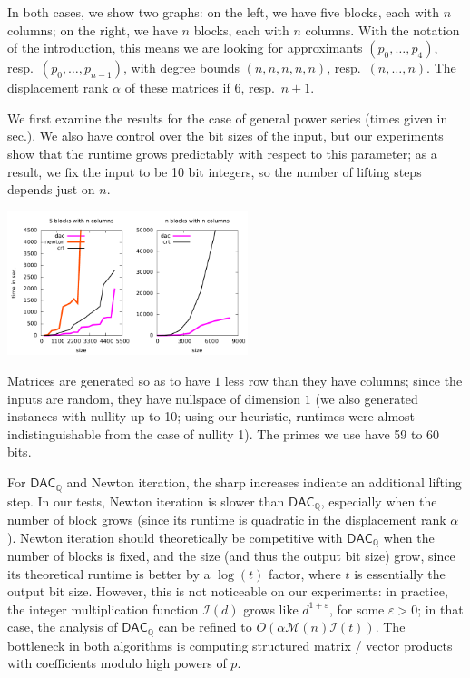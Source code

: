 \documentclass[sigconf]{acmart}
\newcommand{\Q}{\ensuremath{\mathbb{Q}}}
\newcommand{\M}{\ensuremath{\mathscr{M}}}
\newcommand{\I}{\ensuremath{\mathscr{I}}}
\newcommand{\DACQ}{\ensuremath{\mathsf{DAC}_\Q}}
\theoremstyle{acmdefinition}
\begin{document}
In both cases, we show two graphs: on the left, we have five blocks,
each with $n$ columns; on the right, we have $n$ blocks, each with $n$
columns.  With the notation of the introduction, this means we are
looking for approximants $(p_0,\dots,p_4)$, resp.\
$(p_0,\dots,p_{n-1})$, with degree bounds $(n,n,n,n,n)$, resp.\
$(n,\dots,n)$. The displacement rank $\alpha$ of these matrices if
$6$, resp.\ $n+1$.

We first examine the results for the case of general power series
(times given in sec.). We also have control over the bit sizes of the
input, but our experiments show that the runtime grows predictably
with respect to this parameter; as a result, we fix the input to be 10
bit integers, so the number of lifting steps depends just on $n$.

\includegraphics[width=7cm]{plots/compare-general.pdf}

Matrices are generated so as to have $1$ less row than they have
columns; since the inputs are random, they have nullspace of
dimension $1$ (we also generated instances with nullity up to 10;
using our heuristic, runtimes were almost indistinguishable from the
case of nullity 1). The primes we use have 59 to 60 bits.


For $\DACQ$ and Newton iteration, the sharp increases indicate an
additional lifting step. In our tests, Newton iteration is slower than
$\DACQ$, especially when the number of block grows (since its runtime
is quadratic in the displacement rank $\alpha$). Newton iteration
should theoretically be competitive with $\DACQ$ when the number of
blocks is fixed, and the size (and thus the output bit size) grow,
since its theoretical runtime is better by a $\log(t)$ factor, where
$t$ is essentially the output bit size. However, this is not
noticeable on our experiments: in practice, the integer multiplication
function $\I(d)$ grows like $d^{1+\varepsilon}$, for some $\varepsilon
> 0$; in that case, the analysis of $\DACQ$ can be refined to
$O(\alpha \M(n) \I(t))$. The bottleneck in both algorithms is
computing structured matrix / vector products with coefficients modulo
high powers of $p$.
\end{document}
